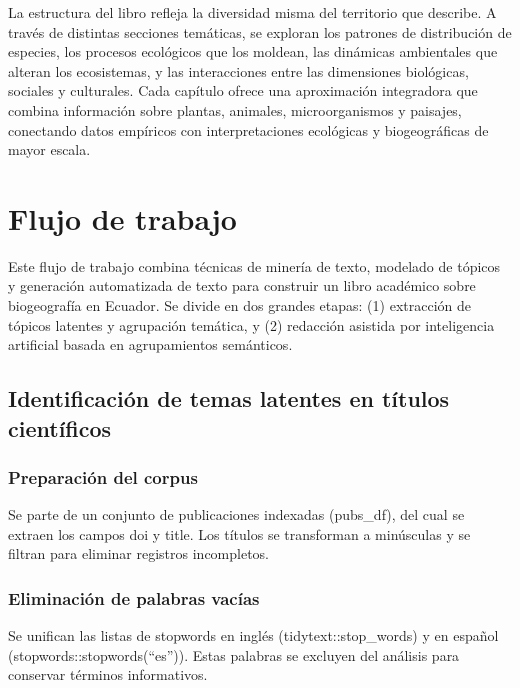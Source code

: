 \documentclass[
  letterpaper,
  DIV=11,
  numbers=noendperiod,
  oneside]{scrreprt}
\begin{document}
La estructura del libro refleja la diversidad misma del territorio que
describe. A través de distintas secciones temáticas, se exploran los
patrones de distribución de especies, los procesos ecológicos que los
moldean, las dinámicas ambientales que alteran los ecosistemas, y las
interacciones entre las dimensiones biológicas, sociales y culturales.
Cada capítulo ofrece una aproximación integradora que combina
información sobre plantas, animales, microorganismos y paisajes,
conectando datos empíricos con interpretaciones ecológicas y
biogeográficas de mayor escala.

\section{Flujo de trabajo}\label{flujo-de-trabajo}

Este flujo de trabajo combina técnicas de minería de texto, modelado de
tópicos y generación automatizada de texto para construir un libro
académico sobre biogeografía en Ecuador. Se divide en dos grandes
etapas: (1) extracción de tópicos latentes y agrupación temática, y (2)
redacción asistida por inteligencia artificial basada en agrupamientos
semánticos.

\subsection{Identificación de temas latentes en títulos
científicos}\label{identificaciuxf3n-de-temas-latentes-en-tuxedtulos-cientuxedficos}

\subsubsection{Preparación del corpus}\label{preparaciuxf3n-del-corpus}

Se parte de un conjunto de publicaciones indexadas (pubs\_df), del cual
se extraen los campos doi y title. Los títulos se transforman a
minúsculas y se filtran para eliminar registros incompletos.

\subsubsection{Eliminación de palabras
vacías}\label{eliminaciuxf3n-de-palabras-vacuxedas}

Se unifican las listas de stopwords en inglés (tidytext::stop\_words) y
en español (stopwords::stopwords(``es'')). Estas palabras se excluyen
del análisis para conservar términos informativos.
\end{document}
